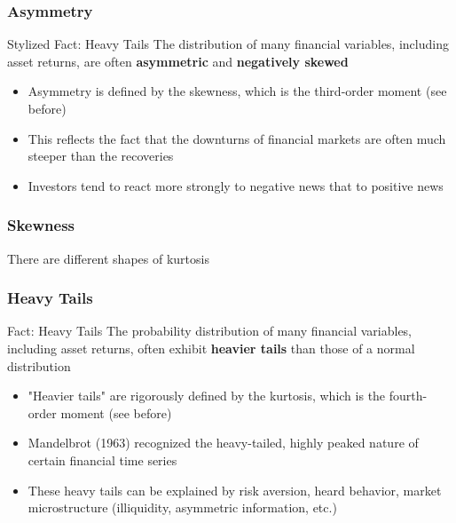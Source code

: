 \documentclass{beamer}
\begin{document}
\begin{frame}
  \frametitle{Asymmetry}

  \begin{block}{Stylized Fact: Heavy Tails}
    The distribution of many financial variables, including asset returns, are often \textbf{asymmetric} and \textbf{negatively skewed}
  \end{block}

  \begin{itemize}
  \item Asymmetry is defined by the skewness, which is the third-order moment (see before)
  \item This reflects the fact that the downturns of financial markets are often much steeper than the recoveries
  \item Investors tend to react more strongly to negative news that to positive news 
  \end{itemize}
\end{frame}


\begin{frame}
  \frametitle{Skewness}
  There are different shapes of kurtosis 
\end{frame}



\begin{frame}
  \frametitle{Heavy Tails}
  \begin{exampleblock}{Fact: Heavy Tails}
    The probability distribution of many financial variables, including asset returns, often exhibit \textbf{heavier tails} than those of a normal distribution
  \end{exampleblock}

  \begin{itemize}
  \item "Heavier tails" are rigorously defined by the kurtosis, which is the fourth-order moment (see before)
  \item Mandelbrot (1963) recognized the heavy-tailed, highly peaked nature of certain financial time series
  \item These heavy tails can be explained by risk aversion, heard behavior, market microstructure (illiquidity, asymmetric information, etc.)
  \end{itemize}    
\end{frame}
\end{document}
